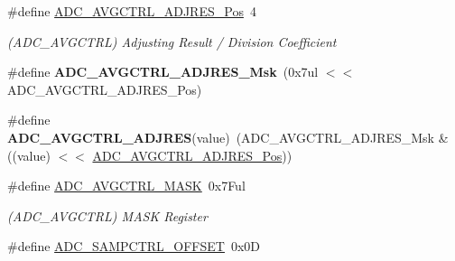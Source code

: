 \begin{DoxyCompactItemize}
\item 
\hypertarget{group___s_a_m_l21___a_d_c_gab08addc2799796177814fb3f44ce4917}{}\#define \hyperlink{group___s_a_m_l21___a_d_c_gab08addc2799796177814fb3f44ce4917}{A\+D\+C\+\_\+\+A\+V\+G\+C\+T\+R\+L\+\_\+\+A\+D\+J\+R\+E\+S\+\_\+\+Pos}~4\label{group___s_a_m_l21___a_d_c_gab08addc2799796177814fb3f44ce4917}

\begin{DoxyCompactList}\small\item\em (A\+D\+C\+\_\+\+A\+V\+G\+C\+T\+R\+L) Adjusting Result / Division Coefficient \end{DoxyCompactList}\item 
\hypertarget{group___s_a_m_l21___a_d_c_gab5fdccb0ce46c4f4c33f415e4c75da33}{}\#define {\bfseries A\+D\+C\+\_\+\+A\+V\+G\+C\+T\+R\+L\+\_\+\+A\+D\+J\+R\+E\+S\+\_\+\+Msk}~(0x7ul $<$$<$ A\+D\+C\+\_\+\+A\+V\+G\+C\+T\+R\+L\+\_\+\+A\+D\+J\+R\+E\+S\+\_\+\+Pos)\label{group___s_a_m_l21___a_d_c_gab5fdccb0ce46c4f4c33f415e4c75da33}

\item 
\hypertarget{group___s_a_m_l21___a_d_c_ga917dc80aef884af5e09702a32b5eefb8}{}\#define {\bfseries A\+D\+C\+\_\+\+A\+V\+G\+C\+T\+R\+L\+\_\+\+A\+D\+J\+R\+E\+S}(value)~(A\+D\+C\+\_\+\+A\+V\+G\+C\+T\+R\+L\+\_\+\+A\+D\+J\+R\+E\+S\+\_\+\+Msk \& ((value) $<$$<$ \hyperlink{group___s_a_m_l21___a_d_c_gab08addc2799796177814fb3f44ce4917}{A\+D\+C\+\_\+\+A\+V\+G\+C\+T\+R\+L\+\_\+\+A\+D\+J\+R\+E\+S\+\_\+\+Pos}))\label{group___s_a_m_l21___a_d_c_ga917dc80aef884af5e09702a32b5eefb8}

\item 
\hypertarget{group___s_a_m_l21___a_d_c_gaaca1e22417099084fd839634334c75d0}{}\#define \hyperlink{group___s_a_m_l21___a_d_c_gaaca1e22417099084fd839634334c75d0}{A\+D\+C\+\_\+\+A\+V\+G\+C\+T\+R\+L\+\_\+\+M\+A\+S\+K}~0x7\+Ful\label{group___s_a_m_l21___a_d_c_gaaca1e22417099084fd839634334c75d0}

\begin{DoxyCompactList}\small\item\em (A\+D\+C\+\_\+\+A\+V\+G\+C\+T\+R\+L) M\+A\+S\+K Register \end{DoxyCompactList}\item 
\hypertarget{group___s_a_m_l21___a_d_c_ga0f78e7dbb17e6c729ec0697ff8880d1b}{}\#define \hyperlink{group___s_a_m_l21___a_d_c_ga0f78e7dbb17e6c729ec0697ff8880d1b}{A\+D\+C\+\_\+\+S\+A\+M\+P\+C\+T\+R\+L\+\_\+\+O\+F\+F\+S\+E\+T}~0x0\+D\label{group___s_a_m_l21___a_d_c_ga0f78e7dbb17e6c729ec0697ff8880d1b}


\end{DoxyCompactItemize}
